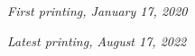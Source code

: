 \documentclass[11pt,fleqn]{book} %
\begin{document}
\begin{sloppypar}
\vspace{0.5cm}
\noindent
\textit{First printing, January 17, 2020}

\vspace{0.5cm}
\noindent
\textit{Latest printing, August 17, 2022}
% 
\newpage

\pagestyle{empty} %
\tableofcontents %
\cleardoublepage %
\pagestyle{fancy} %
%
%
%
%
%
%
%
%
%
%
%
%
%
%
%
%

%

\end{sloppypar}
\end{document}
